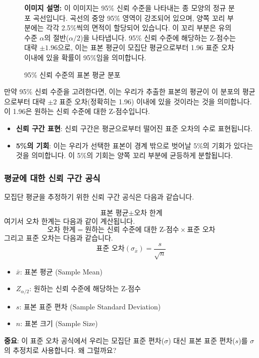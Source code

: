\documentclass[11pt,a4paper]{article}
\begin{document}
\begin{figure}[h!]
  \centering
  \begin{tcolorbox}[colback=gray!10, colframe=gray!50, title=\textbf{95\% 신뢰 수준의 표본 평균 분포 (이미지 설명)}, sharp corners]
    \textbf{이미지 설명:} 이 이미지는 95\% 신뢰 수준을 나타내는 종 모양의 정규 분포 곡선입니다.
    곡선의 중앙 95\% 영역이 강조되어 있으며, 양쪽 꼬리 부분에는 각각 2.5\%씩의 면적이 할당되어 있습니다.
    이 꼬리 부분은 유의 수준 $\alpha$의 절반($\alpha/2$)을 나타냅니다.
    95\% 신뢰 수준에 해당하는 Z-점수는 대략 $\pm 1.96$으로, 이는 표본 평균이 모집단 평균으로부터 1.96 표준 오차 이내에 있을 확률이 95\%임을 의미합니다.
  \end{tcolorbox}
  \caption{95\% 신뢰 수준의 표본 평균 분포}
  \label{fig:95_confidence_level}
\end{figure}

만약 95\% 신뢰 수준을 고려한다면, 이는 우리가 추출한 표본의 평균이 이 분포의 평균으로부터 대략 $\pm 2$ 표준 오차(정확히는 1.96) 이내에 있을 것이라는 것을 의미합니다. 이 1.96은 원하는 신뢰 수준에 대한 Z-점수입니다.

\begin{itemize}
    \item \textbf{신뢰 구간 표현}: 신뢰 구간은 평균으로부터 떨어진 표준 오차의 수로 표현됩니다.
    \item \textbf{5\%의 기회}: 이는 우리가 선택한 표본이 경계 밖으로 벗어날 5\%의 기회가 있다는 것을 의미합니다. 이 5\%의 기회는 양쪽 꼬리 부분에 균등하게 분할됩니다.
\end{itemize}

\subsubsection*{평균에 대한 신뢰 구간 공식}
모집단 평균을 추정하기 위한 신뢰 구간 공식은 다음과 같습니다.

\begin{equation*}
    \text{표본 평균} \pm \text{오차 한계}
\end{equation*}
여기서 오차 한계는 다음과 같이 계산됩니다.
\begin{equation*}
    \text{오차 한계} = \text{원하는 신뢰 수준에 대한 Z-점수} \times \text{표준 오차}
\end{equation*}
그리고 표준 오차는 다음과 같습니다.
\begin{equation*}
    \text{표준 오차} (\sigma_{\bar{x}}) = \frac{s}{\sqrt{n}}
\end{equation*}
\begin{itemize}
    \item $\bar{x}$: 표본 평균 (Sample Mean)
    \item $Z_{\alpha/2}$: 원하는 신뢰 수준에 해당하는 Z-점수
    \item $s$: 표본 표준 편차 (Sample Standard Deviation)
    \item $n$: 표본 크기 (Sample Size)
\end{itemize}
\textbf{중요}: 이 표준 오차 공식에서 우리는 모집단 표준 편차($\sigma$) 대신 표본 표준 편차($s$)를 $\sigma$의 추정치로 사용합니다. 왜 그럴까요?
\end{document}
